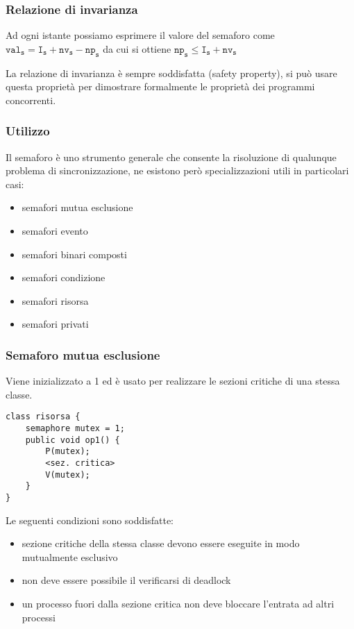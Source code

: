 \subsubsection{Relazione di invarianza}
Ad ogni istante possiamo esprimere il valore del semaforo come $\texttt{val}_\texttt{s} = \texttt{I}_\texttt{s} + \texttt{nv}_\texttt{s} - \texttt{np}_\texttt{s}$ da cui si ottiene $\texttt{np}_\texttt{s}\le \texttt{I}_\texttt{s}+\texttt{nv}_\texttt{s}$

La relazione di invarianza è sempre soddisfatta (safety property), si può usare questa proprietà per dimostrare formalmente le proprietà dei programmi concorrenti.

\subsubsection{Utilizzo}
Il semaforo è uno strumento generale che consente la risoluzione di qualunque problema di sincronizzazione, ne esistono però specializzazioni utili in particolari casi:
\begin{itemize}
    \item semafori mutua esclusione
    \item semafori evento
    \item semafori binari composti
    \item semafori condizione
    \item semafori risorsa
    \item semafori privati
\end{itemize}

\subsubsection{Semaforo mutua esclusione}

Viene inizializzato a 1 ed è usato per realizzare le sezioni critiche di una stessa classe.
\begin{verbatim}
class risorsa {
    semaphore mutex = 1;
    public void op1() {
        P(mutex);
        <sez. critica>
        V(mutex);
    }
}
\end{verbatim}

Le seguenti condizioni sono soddisfatte:
\begin{itemize}
    \item sezione critiche della stessa classe devono essere eseguite in modo mutualmente esclusivo
    \item non deve essere possibile il verificarsi di deadlock
    \item un processo fuori dalla sezione critica non deve bloccare l'entrata ad altri processi
\end{itemize}

